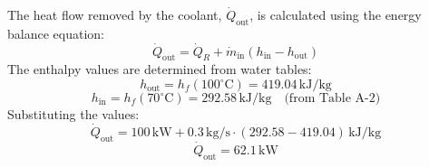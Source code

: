 The heat flow removed by the coolant, \( \dot{Q}_{\text{out}} \), is calculated using the energy balance equation:  
\[
\dot{Q}_{\text{out}} = \dot{Q}_R + \dot{m}_{\text{in}} (h_{\text{in}} - h_{\text{out}})
\]  
The enthalpy values are determined from water tables:  
\[
h_{\text{out}} = h_f(100^\circ\text{C}) = 419.04 \, \text{kJ/kg}
\]  
\[
h_{\text{in}} = h_f(70^\circ\text{C}) = 292.58 \, \text{kJ/kg} \quad \text{(from Table A-2)}
\]  
Substituting the values:  
\[
\dot{Q}_{\text{out}} = 100 \, \text{kW} + 0.3 \, \text{kg/s} \cdot (292.58 - 419.04) \, \text{kJ/kg}
\]  
\[
\dot{Q}_{\text{out}} = 62.1 \, \text{kW}
\]